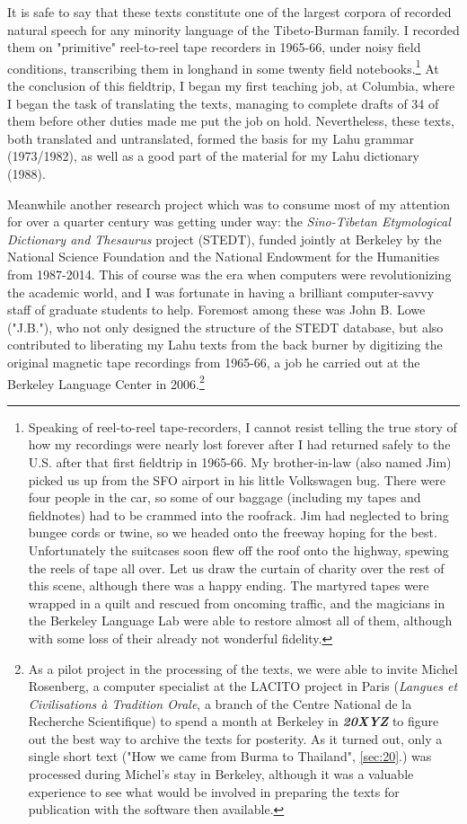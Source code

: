 It is safe to say that these texts constitute one of the largest corpora
of recorded natural speech for any minority language of the
Tibeto-Burman family. I recorded them on "primitive" reel-to-reel tape
recorders in 1965-66, under noisy field conditions, transcribing them in
longhand in some twenty field notebooks.\footnote{Speaking of
  reel-to-reel tape-recorders, I cannot resist telling the true story of
  how my recordings were nearly lost forever after I had returned safely
  to the U.S. after that first fieldtrip in 1965-66. My brother-in-law
  (also named Jim) picked us up from the SFO airport in his little
  Volkswagen bug. There were four people in the car, so some of our
  baggage (including my tapes and fieldnotes) had to be crammed into the
  roofrack. Jim had neglected to bring bungee cords or twine, so we
  headed onto the freeway hoping for the best. Unfortunately the
  suitcases soon flew off the roof onto the highway, spewing the reels
  of tape all over. Let us draw the curtain of charity over the rest of
  this scene, although there was a happy ending. The martyred tapes were
  wrapped in a quilt and rescued from oncoming traffic, and the
  magicians in the Berkeley Language Lab were able to restore almost all
  of them, although with some loss of their already not wonderful
  fidelity.} At the conclusion of this fieldtrip, I began my first
teaching job, at Columbia, where I began the task of translating the
texts, managing to complete drafts of 34 of them before other duties
made me put the job on hold. Nevertheless, these texts, both translated
and untranslated, formed the basis for my Lahu grammar (1973/1982), as
well as a good part of the material for my Lahu dictionary (1988).

Meanwhile another research project which was to consume most of my
attention for over a quarter century was getting under way: the
\emph{Sino-Tibetan Etymological Dictionary and Thesaurus} project
(STEDT), funded jointly at Berkeley by the National Science Foundation
and the National Endowment for the Humanities from 1987-2014. This of
course was the era when computers were revolutionizing the academic
world, and I was fortunate in having a brilliant computer-savvy staff
of graduate students to help. Foremost among these was John B. Lowe
("J.B."), who not only designed the structure of the STEDT database,
but also contributed to liberating my Lahu texts from the back burner
by digitizing the original magnetic tape recordings from 1965-66, a
job he carried out at the Berkeley Language Center in
2006.\footnote{As a pilot project in the processing of the texts, we
  were able to invite Michel Rosenberg, a computer specialist at the
  LACITO project in Paris (\emph{Langues et Civilisations à Tradition
    Orale}, a branch of the Centre National de la Recherche
  Scientifique) to spend a month at Berkeley in \emph{\textbf{20XYZ}}
  to figure out the best way to archive the texts for posterity. As it
  turned out, only a single short text ("How we came from Burma to
  Thailand", \ref{sec:20}.) was processed during Michel's stay in
  Berkeley, although it was a valuable experience to see what would be
  involved in preparing the texts for publication with the software
  then available.}

